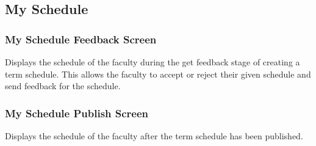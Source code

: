    \pagebreak
   
   
   
   \subsection{My Schedule}
    
    \subsubsection{My Schedule Feedback Screen}
    
    
    
     {Displays the schedule of the faculty during the get feedback stage of creating a term schedule. This allows the faculty to accept or reject their given schedule and send feedback for the schedule.}
    
    
   
   \pagebreak
   
   
   \subsubsection{My Schedule Publish Screen}
    
    
    
     {Displays the schedule of the faculty after the term schedule has been published.}
    
